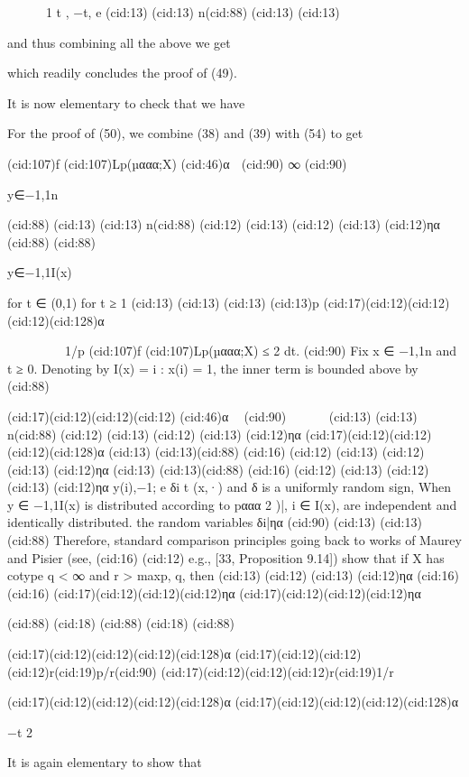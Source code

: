{



 1
t ,
−t,
e
(cid:13)
(cid:13) n(cid:88)
(cid:13)
(cid:13)

and thus combining all the above we get

which readily concludes the proof of (49).

It is now elementary to check that we have

For the proof of (50), we combine (38) and (39) with (54) to get

(cid:107)f (cid:107)Lp(µααα;X) (cid:46)α

(cid:90) ∞
(cid:90)








y∈{−1,1}n

(cid:88)
(cid:13)
(cid:13) n(cid:88)
(cid:12)
(cid:13)
(cid:12)
(cid:13)
(cid:12)ηα
(cid:88)
(cid:88)

y∈{−1,1}I(x)

for t ∈ (0,1)
for t ≥ 1
(cid:13)
(cid:13)
(cid:13)
(cid:13)p
(cid:17)(cid:12)(cid:12)(cid:12)(cid:128)α








1/p
(cid:107)f (cid:107)Lp(µααα;X) ≤ 2
dt.
(cid:90)
Fix x ∈ {−1,1}n and t ≥ 0. Denoting by I(x) = {i : x(i) = 1}, the inner term is bounded above by
(cid:88)

(cid:17)(cid:12)(cid:12)(cid:12) (cid:46)α

(cid:90)





(cid:13)
(cid:13) n(cid:88)
(cid:12)
(cid:13)
(cid:12)
(cid:13)
(cid:12)ηα
(cid:17)(cid:12)(cid:12)(cid:12)(cid:128)α
(cid:13)
(cid:13)(cid:88)
(cid:16)
(cid:12)
(cid:13)
(cid:12)
(cid:13)
(cid:12)ηα
(cid:13)
(cid:13)(cid:88)
(cid:16)
(cid:12)
(cid:13)
(cid:12)
(cid:13)
(cid:12)ηα
y(i),−1; e
δi
t (x,·) and δ is a uniformly random sign,
When y ∈ {−1,1}I(x) is distributed according to pααα
2 )|, i ∈ I(x), are independent and identically distributed.
the random variables δi|ηα
(cid:90)
(cid:13)
(cid:13)(cid:88)
Therefore, standard comparison principles going back to works of Maurey and Pisier (see,
(cid:16)
(cid:12)
e.g., [33, Proposition 9.14]) show that if X has cotype q < ∞ and r > max{p, q}, then
(cid:13)
(cid:12)
(cid:13)
(cid:12)ηα
(cid:16)
(cid:16)
(cid:17)(cid:12)(cid:12)(cid:12)ηα
(cid:17)(cid:12)(cid:12)(cid:12)ηα

(cid:88)
(cid:18) (cid:88)
(cid:18) (cid:88)

(cid:17)(cid:12)(cid:12)(cid:12)(cid:128)α
(cid:17)(cid:12)(cid:12)(cid:12)r(cid:19)p/r(cid:90)
(cid:17)(cid:12)(cid:12)(cid:12)r(cid:19)1/r

(cid:17)(cid:12)(cid:12)(cid:12)(cid:128)α
(cid:17)(cid:12)(cid:12)(cid:12)(cid:128)α

−t
2

It is again elementary to show that

}
